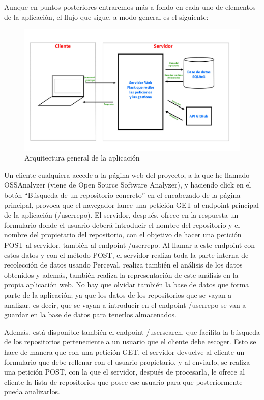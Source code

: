 \documentclass[a4paper, 12pt]{book}
\begin{document}
Aunque en puntos posteriores entraremos más a fondo en cada uno de elementos de la aplicación, el flujo que sigue, a modo general es el siguiente:

\begin{figure}[H]
  \centering
  \includegraphics[width=1\textwidth]{img/arquitecturageneralv2.jpg}
  \caption{Arquitectura general de la aplicación}
  \label{figura:arqgeneral}
\end{figure}

Un cliente cualquiera accede a la página web del proyecto, a la que he llamado OSSAnalyzer (viene de Open Source Software Analyzer), y haciendo click en el botón ``Búsqueda de un repositorio concreto'' en el encabezado de la página principal, provoca que el navegador lance una petición GET al endpoint principal de la aplicación (/userrepo). El servidor, después, ofrece en la respuesta un formulario donde el usuario deberá introducir el nombre del repositorio y el nombre del propietario del repositorio, con el objetivo de hacer una petición POST al servidor, también al endpoint /userrepo. Al llamar a este endpoint con estos datos y con el método POST, el servidor realiza toda la parte interna de recolección de datos usando Perceval, realiza también el análisis de los datos obtenidos y además, también realiza la representación de este análisis en la propia aplicación web. No hay que olvidar también la base de datos que forma parte de la aplicación; ya que los datos de los repositorios que se vayan a analizar, es decir, que se vayan a introducir en el endpoint /userrepo se van a guardar en la base de datos para tenerlos almacenados.

Además, está disponible también el endpoint /usersearch, que facilita la búsqueda de los repositorios perteneciente a un usuario que el cliente debe escoger. Esto se hace de manera que con una petición GET, el servidor devuelve al cliente un formulario que debe rellenar con el usuario propietario, y al enviarlo, se realiza una petición POST, con la que el servidor, después de procesarla, le ofrece al cliente la lista de repositorios que posee ese usuario para que posteriormente pueda analizarlos.
\end{document}
